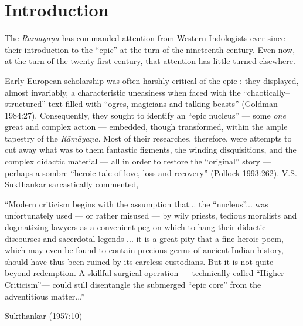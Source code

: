 \chapter*{Introduction}\label{introduction}




The {\sl Rāmāyaṇa} has commanded attention from Western Indologists ever since their introduction to the “epic” at the turn of the nineteenth century. Even now, at the turn of the twenty-first century, that attention has little turned elsewhere.  

Early European scholarship was often harshly critical of the epic : they displayed, almost invariably, a characteristic uneasiness when faced with the “chaotically–structured” text filled with “ogres, magicians and talking beasts” (Goldman 1984:27). Consequently, they sought to identify an “epic nucleus” --- some {\sl one} great and complex action --- embedded, though transformed, within the ample tapestry of the {\sl Rāmāyaṇa}. Most of their researches, therefore, were attempts to cut away what was to them fantastic figments, the winding disquisitions, and the complex didactic material --- all in order to restore the “original” story --- perhaps a sombre “heroic tale of love, loss and recovery” (Pollock 1993:262). V.S. Sukthankar sarcastically commented,  

\begin{myquote}
“Modern criticism begins with the assumption that... the “nucleus”... was unfortunately used --- or rather misused --- by wily priests, tedious moralists and dogmatizing lawyers as a convenient peg on which to hang their didactic discourses and sacerdotal legends ... it is a great pity that a fine heroic poem, which may even be found to contain precious germs of ancient Indian history, should have thus been ruined by its careless custodians. But it is not quite beyond redemption. A skillful surgical operation --- technically called “Higher Criticism”— could still disentangle the submerged “epic core” from the adventitious matter...”

\hfill Sukthankar (1957:10)
\end{myquote}

